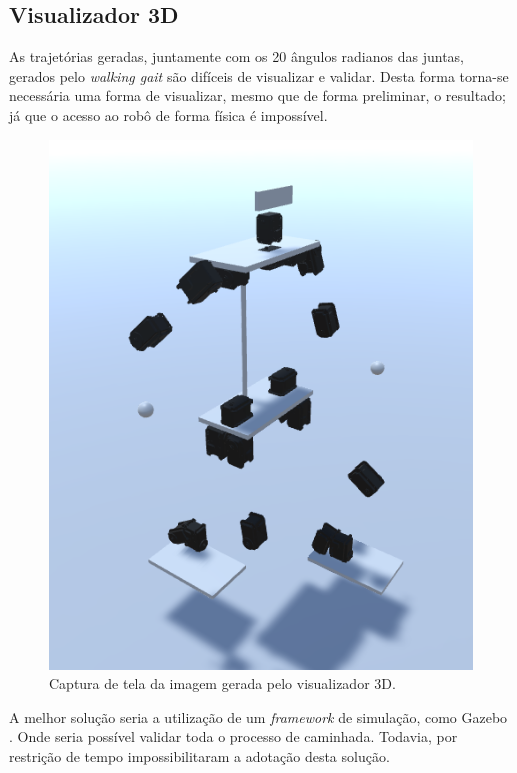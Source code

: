 \subsection{Visualizador 3D}

As trajetórias geradas, juntamente com os 20 ângulos radianos das juntas, gerados pelo \textit{walking gait} são difíceis de visualizar e validar. Desta forma torna-se necessária uma forma de visualizar, mesmo que de forma preliminar, o resultado; já que o acesso ao robô de forma física é impossível.

\begin{figure}[htb]
	\centering
	\includegraphics[scale=0.4]{imagens/visualizador3d}
	\caption{Captura de tela da imagem gerada pelo visualizador 3D.}
	\label{fig:architecture:visualization:printscreen}
\end{figure}

A melhor solução seria a utilização de um \textit{framework} de simulação, como Gazebo \cite{gazebo}. Onde seria possível validar toda o processo de caminhada. Todavia, por restrição de tempo impossibilitaram a adotação desta solução. 

